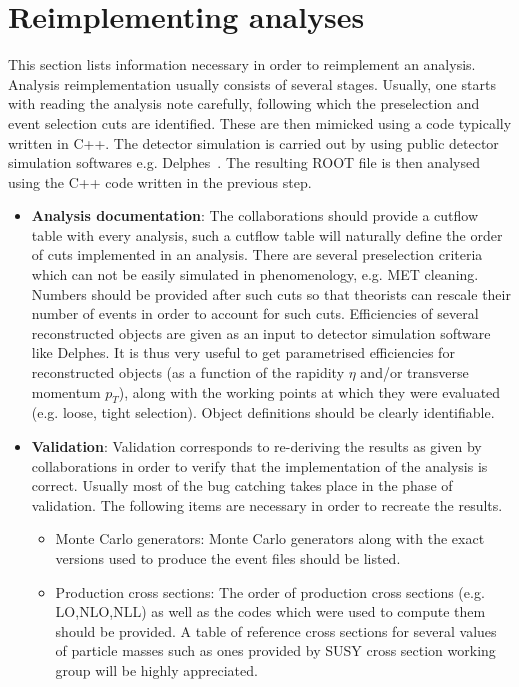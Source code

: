 \section{Reimplementing analyses}
This section lists information necessary in order to reimplement an analysis. Analysis reimplementation usually consists of several stages. Usually, one starts with reading the analysis note carefully, following which the preselection and event selection cuts are identified. These are then mimicked using a code typically written in C++. The detector simulation is carried out by using public detector simulation softwares e.g.  Delphes~\cite{deFavereau:2013fsa}.  The resulting ROOT file is then analysed using the C++ code written in the previous step.
\begin{itemize}
\item \textbf{Analysis documentation}: The collaborations should provide a cutflow table with every analysis, such a cutflow table will naturally define the order of cuts implemented in an analysis. There are several preselection criteria which can not be easily simulated in phenomenology, e.g. MET cleaning. Numbers should be provided after such cuts so that theorists can rescale their number of events in order to account for such cuts. Efficiencies of several reconstructed objects are given as an input to detector simulation software like Delphes. It is thus very useful to get parametrised efficiencies for reconstructed objects (as a function of the rapidity $\eta$ and/or transverse momentum $p_T$), along with the working points at which they were evaluated (e.g. loose, tight selection). Object definitions should be clearly identifiable. 
\item \textbf{Validation}: Validation corresponds to re-deriving the results as given by collaborations in order to verify that the implementation of the analysis is correct. Usually most of the bug catching takes place in the phase of validation. The following items are necessary in order to recreate the results. 
\begin {itemize}
	\item Monte Carlo generators: Monte Carlo generators along with the exact versions used to produce the event files should be listed. 
	\item Production cross sections: The order of production cross sections (e.g. LO,NLO,NLL) as well as the codes which were used to compute them should be provided. A table of reference cross sections for several values of particle masses such as ones provided by SUSY cross section working group will be highly appreciated.

\end{itemize}
\end{itemize}
